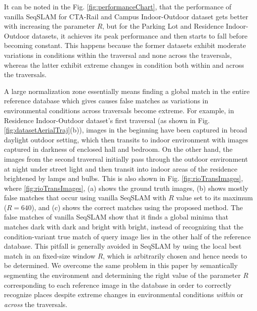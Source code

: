 \documentclass[letterpaper, 10 pt, conference]{ieeeconf}  %
\begin{document}
It can be noted in the Fig. \ref{fig:performanceChart}, that the performance of vanilla SeqSLAM for CTA-Rail and Campus Indoor-Outdoor dataset gets better with increasing the parameter $R$, but for the Parking Lot and Residence Indoor-Outdoor datasets, it achieves its peak performance and then starts to fall before becoming constant. This happens because the former datasets exhibit moderate variations in conditions within the traversal and none across the traversals, whereas the latter exhibit extreme changes in condition both within and across the traversals. 

A large normalization zone essentially means finding a global match in the entire reference database which gives causes false matches as variations in environmental conditions across traversals become extreme. For example, in Residence Indoor-Outdoor dataset's first traversal (as shown in Fig. \ref{fig:datasetAerialTraj}(b)), images in the beginning have been captured in broad daylight outdoor setting, which then transits to indoor environment with images captured in darkness of enclosed hall and bedroom. On the other hand, the images from the second traversal initially pass through the outdoor environment at night under street light and then transit into indoor areas of the residence brightened by lamps and bulbs. This is also shown in Fig. \ref{fig:rioTransImages}, where \ref{fig:rioTransImages}, (a) shows the ground truth images, (b) shows mostly false matches that occur using vanilla SeqSLAM with $R$ value set to its maximum ($R=640$), and (c) shows the correct matches using the proposed method. The false matches of vanilla SeqSLAM show that it finds a global minima that matches dark with dark and bright with bright, instead of recognizing that the condition-variant true match of query image lies in the other half of the reference database. This pitfall is generally avoided in SeqSLAM by using the local best match in an fixed-size window $R$, which is arbitrarily chosen and hence needs to be determined. We overcome the same problem in this paper by semantically segmenting the environment and determining the right value of the parameter $R$ corresponding to each reference image in the database in order to correctly recognize places despite extreme changes in environmental conditions \emph{within} or \emph{across} the traversals.

\end{document}
